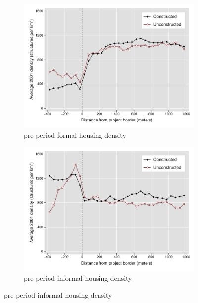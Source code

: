 \documentclass[12pt]{article}
\begin{document}
\begin{figure}[h!]
        \centering
        \caption[ Pre-Period Housing Densities in Constructed and Unconstructed Projects Areas ]
        {\small Pre-Period Housing Densities in Constructed and Unconstructed projects } 
        \begin{subfigure}[b]{0.495\textwidth}
            \centering
            \includegraphics[width=\textwidth,trim={0.3cm .3cm 0.1cm 0cm}, clip=true]{figures/bblu_for_pre_means}
            \caption[Network2]%
            {{\small pre-period formal housing density}}    
            \label{fig:prefor}
        \end{subfigure}
        \hfill
        \begin{subfigure}[b]{0.495\textwidth}  
            \centering 
            \includegraphics[width=\textwidth,trim={0.3cm .3cm 0.1cm 0cm}, clip=true]{figures/bblu_inf_pre_means}
            \caption[]%
            {{\small pre-period informal housing density}}    
            \label{fig:preinf}
        \end{subfigure}
        \label{fig:rawbblumeans}
        \vspace{-6mm}
    \end{figure} 
\end{document}
